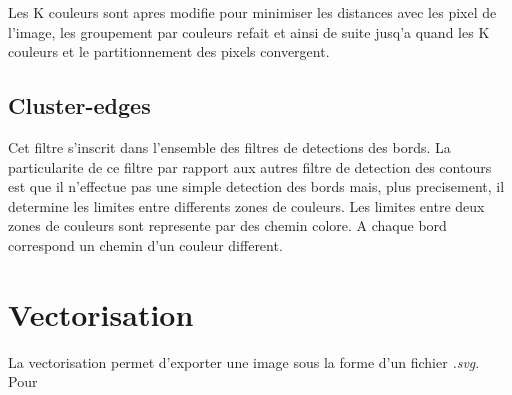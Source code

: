 \documentclass[twoside,openright,a4paper,11pt,french]{article}
\begin{document}
Les K couleurs sont apres modifie pour minimiser les distances avec
les pixel de l'image, les groupement par couleurs refait et ainsi de
suite jusq'a quand les K couleurs et le partitionnement des pixels
convergent. 

\subsection{Cluster-edges}
Cet filtre s'inscrit dans l'ensemble des filtres de detections des
bords. La particularite de ce filtre par rapport aux autres filtre de
detection des contours est que il n'effectue pas une simple detection
des bords mais, plus precisement, il determine les limites entre
differents zones de couleurs. 
Les limites entre deux zones de couleurs sont represente par des
chemin colore. A chaque bord correspond un chemin d'un couleur
different.



\newpage

\section{Vectorisation} 
La vectorisation permet d'exporter une image sous la forme d'un
fichier {\it .svg}. Pour 
\end{document}

